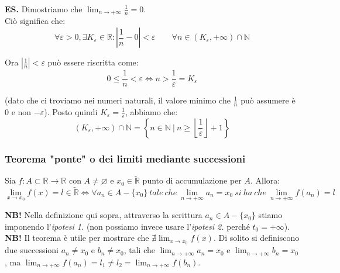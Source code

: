 \documentclass{article}
\begin{document}
\noindent\textbf{ES.} Dimostriamo che $\lim_{n \to +\infty} \frac{1}{n} = 0$.\\
Ciò significa che:
\begin{equation*}
    \forall \varepsilon > 0, \exists K_\varepsilon \in \mathbb{R} : \left|\frac{1}{n} - 0\right| < \varepsilon \qquad \forall n \in (K_\varepsilon, +\infty) \cap \mathbb{N}
\end{equation*}

\noindent Ora $|\frac{1}{n}| < \varepsilon$ può essere riscritta come:
\begin{equation*}
    0 \leq \frac{1}{n} < \varepsilon \iff n > \frac{1}{\varepsilon} = K_\varepsilon
\end{equation*}

\noindent (dato che ci troviamo nei numeri naturali, il valore minimo che $\frac{1}{n}$ può assumere è $0$ e non $-\varepsilon$). Posto quindi $K_\varepsilon = \frac{1}{\varepsilon}$, abbiamo che:
\begin{equation*}
    (K_\varepsilon, +\infty) \cap \mathbb{N} = \left\{n \in \mathbb{N} \ | \ n \geq \left\lfloor \frac{1}{\varepsilon} \right\rfloor + 1\right\}
\end{equation*}

\subsubsection{Teorema "ponte" o dei limiti mediante successioni}
Sia $f: A \subset \mathbb{R} \xrightarrow{} \mathbb{R}$ con $A \neq \varnothing$ e $x_0 \in \widetilde{\mathbb{R}}$ punto di accumulazione per $A$. Allora:
\begin{equation*}
    \lim_{x \to x_0} f(x) = l \in \widetilde{\mathbb{R}} \iff \forall a_n \in A - \{x_0\} \ tale \ che \ \lim_{n \to +\infty} a_n = x_0 \ si \ ha \ che \ \lim_{n \to +\infty} f(a_n) = l
\end{equation*}

\noindent\textbf{NB!} Nella definizione qui sopra, attraverso la scrittura $a_n \in A - \{x_0\}$ stiamo imponendo l'\textit{ipotesi 1.} (non possiamo invece usare l'\textit{ipotesi 2.} perché $t_0 = +\infty$).\\

\noindent\textbf{NB!} Il teorema è utile per mostrare che $\nexists \lim_{x \to x_0} f(x)$. Di solito si definiscono due successioni $a_n \neq x_0$ e $b_n \neq x_0$, tali che $\lim_{n \to +\infty} a_n = x_0$ e $\lim_{n \to +\infty} b_n = x_0$, ma $\lim_{n \to +\infty} f(a_n) = l_1 \neq l_2 = \lim_{n \to +\infty} f(b_n)$.\\
\end{document}
